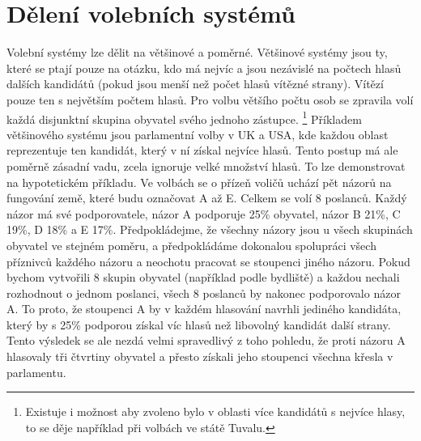 \documentclass[12pt]{report}
\begin{document}
\section{Dělení volebních systémů} Volební systémy lze dělit na většinové a poměrné.
Většinové systémy jsou ty, které se ptají pouze na otázku, kdo má nejvíc a jsou nezávislé na počtech hlasů dalších kandidátů (pokud jsou menší než počet hlasů vítězné strany).
Vítězí pouze ten s největším počtem hlasů.
Pro volbu většího počtu osob se zpravila volí každá disjunktní skupina obyvatel svého jednoho zástupce.
\footnote{Existuje i možnost aby zvoleno bylo v oblasti více kandidátů s nejvíce hlasy, to se děje například při volbách ve státě Tuvalu.\autocite{TUV}} Příkladem většinového systému jsou parlamentní volby v UK a USA, kde každou oblast reprezentuje ten kandidát, který v ní získal nejvíce hlasů.
Tento postup má ale poměrně zásadní vadu, zcela ignoruje velké množství hlasů.
To lze demonstrovat na hypotetickém příkladu.
Ve volbách se o přízeň voličů uchází pět názorů na fungování země, které budu označovat A až E.
Celkem se volí 8 poslanců.
Každý názor má své podporovatele, názor A podporuje 25\% obyvatel, názor B 21\%, C 19\%, D 18\% a E 17\%.
Předpokládejme, že všechny názory jsou u všech skupinách obyvatel ve stejném poměru, a předpokládáme dokonalou spolupráci všech příznivců každého názoru a neochotu pracovat se stoupenci jiného názoru.
Pokud bychom vytvořili 8 skupin obyvatel (například podle bydliště) a každou nechali rozhodnout o jednom poslanci, všech 8 poslanců by nakonec podporovalo názor A.
To proto, že stoupenci A by v každém hlasování navrhli jediného kandidáta, který by s 25\% podporou získal víc hlasů než libovolný kandidát další strany.
Tento výsledek se ale nezdá velmi spravedlivý z toho pohledu, že proti názoru A hlasovaly tři čtvrtiny obyvatel a přesto získali jeho stoupenci všechna křesla v parlamentu.
\end{document}
